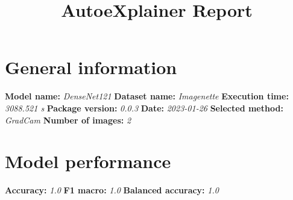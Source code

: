 \documentclass{article}%
\title{AutoeXplainer Report}%
\date{}%
\begin{document}
%
\normalsize%
\maketitle%
\section*{General information}%
\label{sec:Generalinformation}%
\textbf{Model name: }%
\textit{DenseNet121 \newline%
}%
\textbf{Dataset name: }%
\textit{Imagenette \newline%
}%
\textbf{Execution time: }%
\textit{3088.521 s \newline%
}%
\textbf{Package version: }%
\textit{0.0.3 \newline%
}%
\textbf{Date: }%
\textit{2023{-}01{-}26 \newline%
}%
\textbf{Selected method: }%
\textit{GradCam \newline%
}%
\textbf{Number of images: }%
\textit{2}

%
\section*{Model performance}%
\label{sec:Modelperformance}%
\textbf{Accuracy: }%
\textit{1.0 \newline%
}%
\textbf{F1 macro: }%
\textit{1.0 \newline%
}%
\textbf{Balanced accuracy: }%
\textit{1.0 \newline%
}

%
\end{document}
